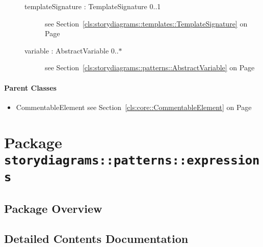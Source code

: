 \begin{description}
\begin{description}
	
\item[templateSignature : TemplateSignature 			\symbol{"5B}0..1\symbol{"5D}]
see Section~\ref{cls:storydiagrams::templates::TemplateSignature} on Page~\pageref{cls:storydiagrams::templates::TemplateSignature}
\hspace{\fill}
\nopagebreak


	
\item[variable : AbstractVariable 			\symbol{"5B}0..$*$\symbol{"5D}]
see Section~\ref{cls:storydiagrams::patterns::AbstractVariable} on Page~\pageref{cls:storydiagrams::patterns::AbstractVariable}
\hspace{\fill}
\nopagebreak


	
	\end{description}
	

\end{description}

\paragraph{Parent Classes}
\begin{itemize}
\item CommentableElement see Section~\ref{cls:core::CommentableElement} on Page~\pageref{cls:core::CommentableElement}\end{itemize}
\newpage
		


\section{Package \bfseries \texttt{storydiagrams::patterns::expressions}\normalfont}
\subsection{Package Overview}
			
		



\subsection{Detailed Contents Documentation}
